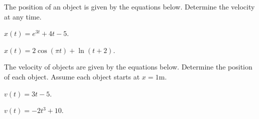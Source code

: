 
\begin{problem}
\item The position of an object is given by the equations
  below. Determine the velocity at any time.
  \begin{subproblem}
  \item $x(t) = e^{3t} + 4t  - 5$.
    \vfill
  \item $x(t) = 2\cos(\pi t) + \ln(t+2)$.
    \vfill
  \end{subproblem}
\item The velocity of objects are given by the equations
  below. Determine the position of each object. Assume each object
  starts at $x=1$m.
  \begin{subproblem}
  \item $v(t) = 3t - 5$.
    \vfill
  \item $v(t) = -2 t^3 + 10$.
    \vfill
  \end{subproblem}
\end{problem}


